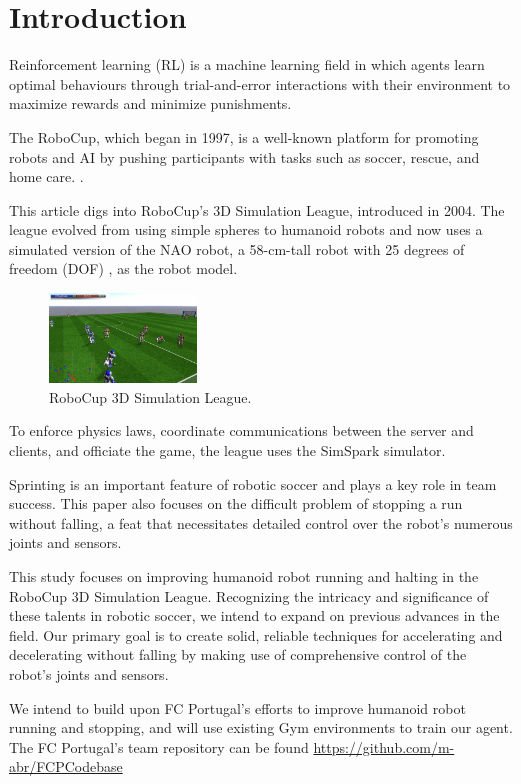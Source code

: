 \documentclass[conference]{IEEEtran}
\begin{document}
\section{Introduction}

Reinforcement learning (RL) is a machine learning field in which agents learn optimal behaviours through trial-and-error interactions with their environment to maximize rewards and minimize punishments.

The RoboCup, which began in 1997, is a well-known platform for promoting robots and AI by pushing participants with tasks such as soccer, rescue, and home care. \cite{robocup97}.

This article digs into RoboCup's 3D Simulation League, introduced in 2004. The league evolved from using simple spheres to humanoid robots and now uses a simulated version of the NAO robot, a 58-cm-tall robot with 25 degrees of freedom (DOF) \cite{naorobot}, as the robot model.

\begin{figure}[htbp]
    \centerline{\includegraphics[width=0.35\textwidth]{images/robocup3d.png}}
    \caption{RoboCup 3D Simulation League.}
    \label{fig:robocup3d}
\end{figure}

To enforce physics laws, coordinate communications between the server and clients, and officiate the game, the league uses the SimSpark simulator.

Sprinting is an important feature of robotic soccer and plays a key role in team success. This paper also focuses on the difficult problem of stopping a run without falling, a feat that necessitates detailed control over the robot's numerous joints and sensors.

This study focuses on improving humanoid robot running and halting in the RoboCup 3D Simulation League.
Recognizing the intricacy and significance of these talents in robotic soccer, we intend to expand on previous advances in the field.
Our primary goal is to create solid, reliable techniques for accelerating and decelerating without falling by making use of comprehensive control
of the robot's joints and sensors.

We intend to build upon FC Portugal's efforts to improve humanoid robot running and stopping, and will use existing Gym environments to train our agent.
The FC Portugal's team repository can be found \href{https://github.com/m-abr/FCPCodebase}{https://github.com/m-abr/FCPCodebase}
\end{document}
